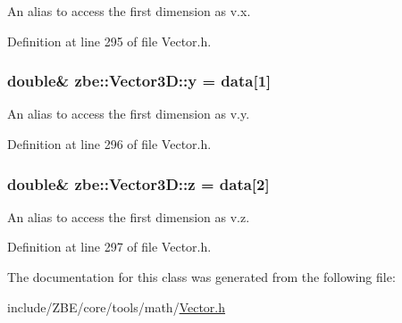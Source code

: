 An alias to access the first dimension as v.\+x. 



Definition at line 295 of file Vector.\+h.

\hypertarget{classzbe_1_1_vector3_d_a0c6f850b940c6eb85132db01490f108f}{}
\subsubsection[{y}]{\setlength{\rightskip}{0pt plus 5cm}double\& zbe\+::\+Vector3\+D\+::y = {\bf data}\mbox{[}1\mbox{]}}\label{classzbe_1_1_vector3_d_a0c6f850b940c6eb85132db01490f108f}


An alias to access the first dimension as v.\+y. 



Definition at line 296 of file Vector.\+h.

\hypertarget{classzbe_1_1_vector3_d_a165df2c9c8ab4cf1ebb322ecffc9efba}{}
\subsubsection[{z}]{\setlength{\rightskip}{0pt plus 5cm}double\& zbe\+::\+Vector3\+D\+::z = {\bf data}\mbox{[}2\mbox{]}}\label{classzbe_1_1_vector3_d_a165df2c9c8ab4cf1ebb322ecffc9efba}


An alias to access the first dimension as v.\+z. 



Definition at line 297 of file Vector.\+h.



The documentation for this class was generated from the following file\+:\begin{DoxyCompactItemize}
\item 
include/\+Z\+B\+E/core/tools/math/\hyperlink{_vector_8h}{Vector.\+h}\end{DoxyCompactItemize}
